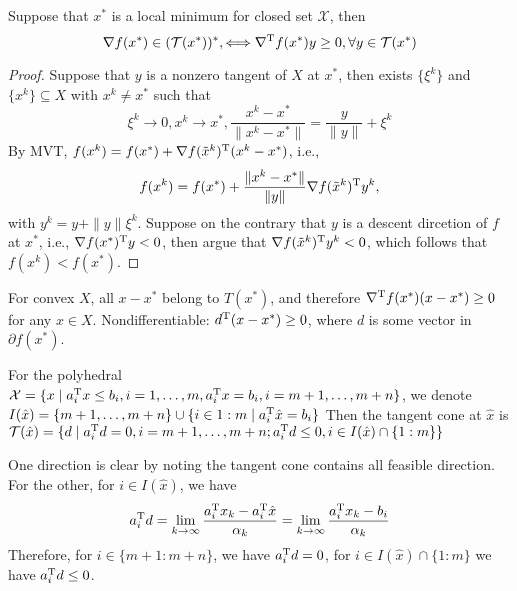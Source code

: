 \begin{proposition}
Suppose that $x^*$ is a local minimum for closed set $\mathcal{X}$, then 
\[
\nabla f(x^*)\in(\mathcal{T}(x^*))^*,\Longleftrightarrow
\nabla^{\mathrm T} f(x^*)y\ge0,\forall y\in\mathcal{T}(x^*)
\]
\end{proposition}
\begin{proof}
Suppose that $y$ is a nonzero tangent of $X$ at $x^*$, then exists $\{\xi^k\}$ and $\{x^k\}\subseteq X$ with $x^k\ne x^*$ such that
\[
\xi^k\to 0,x^k\to x^*,\frac{x^k-x^*}{\|x^k-x^*\|}=\frac{y}{\|y\|}+\xi^k
\]
By MVT, $f(x^k) = f(x^*) + \nabla f(\tilde{x}^k)^{\mathrm T}(x^k-x^*)$, i.e.,
\[
f(x^k) =  f(x^*) + \frac{\|x^k-x^*\|}{\|y\|}\nabla f(\tilde{x}^k)^{\mathrm T} y^k,
\]
with $y^k = y + \|y\|\xi^k$. Suppose on the contrary that $y$ is a descent dircetion of $f$ at $x^*$, i.e., $\nabla f(x^*)^{\mathrm T} y<0$, then argue that $\nabla f(\tilde{x}^k)^{\mathrm T} y^k<0$, which follows that $f(x^k)<f(x^*)$.
\end{proof}
\begin{corollary}
For convex $X$, all $x-x^*$ belong to $T(x^*)$, and therefore $\nabla^{\mathrm T} f(x^*)(x-x^*)\ge0$ for any $x\in X$.
Nondifferentiable: $d^{\mathrm T} (x-x^*)\ge0$, where $d$ is some vector in $\partial f(x^*)$.
\end{corollary}
\begin{example}
For the polyhedral $\mathcal{X}=\{x\mid a_i^{\mathrm T} x\le b_i, i=1,\dots,m, a_i^{\mathrm T} x = b_i, i=m+1,\dots,m+n\}$, we denote $I(\hat{x}) = \{m+1,\dots,m+n\}\cup\{i\in 1:m\mid a_i^{\mathrm T} \hat{x}=b_i\}$
Then the tangent cone at $\hat{x}$ is $\mathcal{T}(\hat{x}) = \{d\mid a_i^{\mathrm T} d=0, i=m+1,\dots,m+n; a_i^{\mathrm T} d\le0, i\in I(\hat{x})\cap\{1:m\}\}$

One direction is clear by noting the tangent cone contains all feasible direction.
For the other, for $i\in I(\hat{x})$, we have
\[
a_i^{\mathrm T} d = \lim_{k\to\infty}\frac{a_i^{\mathrm T} x_k - a_i^{\mathrm T}\hat{x}}{\alpha_k}=\lim_{k\to\infty}\frac{a_i^{\mathrm T} x_k - b_i}{\alpha_k}
\]
Therefore, for $i\in\{m+1:m+n\}$, we have $a_i^{\mathrm T} d=0$, for $i\in I(\hat{x})\cap\{1:m\}$ we have $a_i^{\mathrm T} d\le0$.
\end{example}

